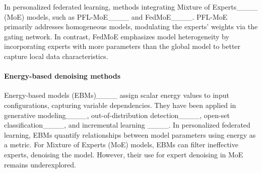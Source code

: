 In personalized federated learning, methods integrating Mixture of Experts____ (MoE) models, such as PFL-MoE____ and FedMoE____. PFL-MoE primarily addresses homogeneous models, modulating the experts' weights via the gating network. In contrast, FedMoE emphasizes model heterogeneity by incorporating experts with more parameters than the global model to better capture local data characteristics. 


\paragraph{Energy-based denoising methods}



Energy-based models (EBMs)____ assign scalar energy values to input configurations, capturing variable dependencies. They have been applied in generative modeling____, out-of-distribution detection____, open-set classification____, and incremental learning ____. In personalized federated learning, EBMs quantify relationships between model parameters using energy as a metric. For Mixture of Experts (MoE) models, EBMs can filter ineffective experts, denoising the model. However, their use for expert denoising in MoE remains underexplored.